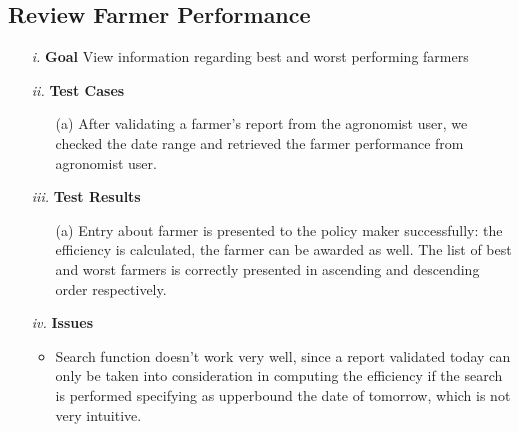 \documentclass[table, 12pt]{article}
\begin{document}
\subsection{Review Farmer Performance}
\begin{itemize}
    \item[\textit{i.}] \textbf{Goal} View information regarding best and worst performing farmers
    \item[\textit{ii.}] \textbf{Test Cases}
    \begin{itemize}
        \item[(a)] After validating a farmer's report from the agronomist user, we checked the date range and retrieved the farmer performance from agronomist user.
    \end{itemize}
    \item[\textit{iii.}] \textbf{Test Results}
    \begin{itemize}
        \item[(a)] Entry about farmer is presented to the policy maker successfully: the efficiency is calculated, the farmer can be awarded as well. The list of best and worst farmers is correctly presented in ascending and descending order respectively.
    \end{itemize} 
    \item[\textit{iv.}] \textbf{Issues}
    \begin{itemize}
        \item Search function doesn't work very well, since a report validated today can only be taken into consideration in computing the efficiency if the search is performed specifying as upperbound the date of tomorrow, which is not very intuitive.
    \end{itemize} 
\end{itemize}
\end{document}
